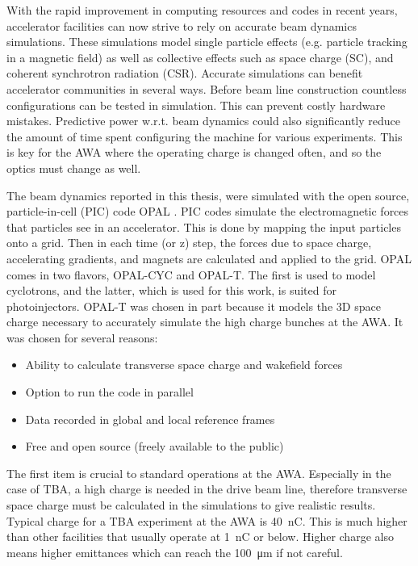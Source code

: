   \label{simulations}
\label{sec:code}

With the rapid improvement in computing resources and codes in recent years,  
accelerator facilities can now strive to rely on accurate beam dynamics simulations. 
These simulations model single particle effects 
(e.g. particle tracking in a magnetic field) as well as collective effects such as space charge (SC),  
and coherent synchrotron radiation (CSR).
Accurate simulations can benefit accelerator communities in several ways.
Before beam line construction countless configurations can be tested in simulation.
This can prevent costly hardware mistakes. 
Predictive power w.r.t. beam dynamics could also significantly reduce the amount of time 
spent configuring the machine for various experiments. This is key for the AWA
where the operating charge is changed often, and so the optics must change as well.

The beam dynamics reported in this thesis, were simulated with 
the open source, particle-in-cell (PIC) code OPAL \cite{opal}. 
PIC codes simulate the electromagnetic forces that particles see in an accelerator. 
This is done by mapping the input particles onto a grid. 
Then in each time (or z) step, the forces due to space charge, accelerating gradients, 
and magnets are calculated and applied to the grid.
OPAL comes in two flavors, OPAL-CYC and OPAL-T. The first is used to model 
cyclotrons, and the latter, which is used for this work, is suited for photoinjectors. 
OPAL-T was chosen in part because it models the 3D space charge necessary to accurately simulate the high charge bunches at the AWA. 
It was chosen for several reasons:
\begin{itemize}
	\item Ability to calculate transverse space charge and wakefield forces 
	\item Option to run the code in parallel
	\item Data recorded in global and local reference frames 
	\item Free and open source (freely available to the public)
\end{itemize} 

The first item is crucial to standard operations at the AWA. Especially in the 
case of TBA, a high charge is needed in the drive beam line, therefore transverse 
space charge must be calculated in the simulations to give realistic results.
Typical charge for a TBA experiment at the AWA is \SI{40}{nC}. 
This is much higher than other facilities that usually operate at \SI{1}{nC} or below. 
Higher charge also means higher emittances which can reach the \SI{100}{\micro\meter} if not careful.

